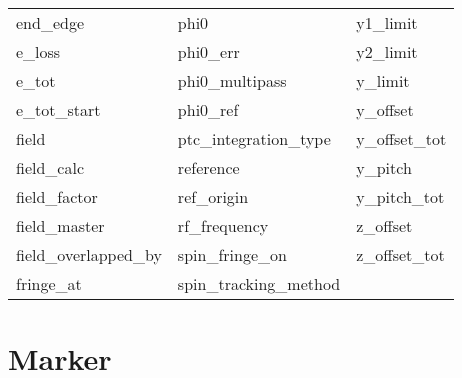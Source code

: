 \begin{tabular}{lll}
end_edge                    & phi0                        & y1_limit                    \\
e_loss                      & phi0_err                    & y2_limit                    \\
e_tot                       & phi0_multipass              & y_limit                     \\
e_tot_start                 & phi0_ref                    & y_offset                    \\
field                       & ptc_integration_type        & y_offset_tot                \\
field_calc                  & reference                   & y_pitch                     \\
field_factor                & ref_origin                  & y_pitch_tot                 \\
field_master                & rf_frequency                & z_offset                    \\
field_overlapped_by         & spin_fringe_on              & z_offset_tot                \\
fringe_at                   & spin_tracking_method        &                             \\
 \bottomrule
 \end{tabular}
 \vfill
 
 \section{Marker}
 \label{s:list.marker}
 
